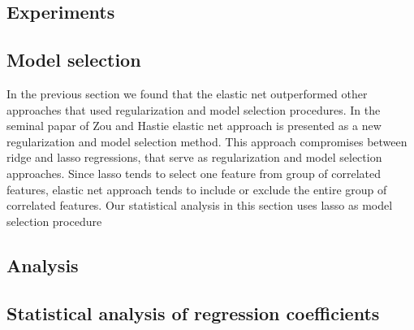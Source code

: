 \documentclass{article}
\begin{document}
\subsection{Experiments}

\subsection{Model selection}
In the  previous section we found that the elastic net outperformed other approaches that used regularization and model selection procedures. In the seminal papar of Zou and Hastie elastic net approach is presented as  a new regularization and model selection method. This approach compromises between ridge and lasso regressions, that serve as regularization and model selection approaches. Since lasso tends to select one feature from group of correlated features, elastic net approach tends to include or exclude the entire group of correlated features. Our statistical analysis in this section uses lasso as model selection procedure 

\subsection{Analysis}
\newpage
\subsection{Statistical analysis of regression coefficients}


\end{document}
